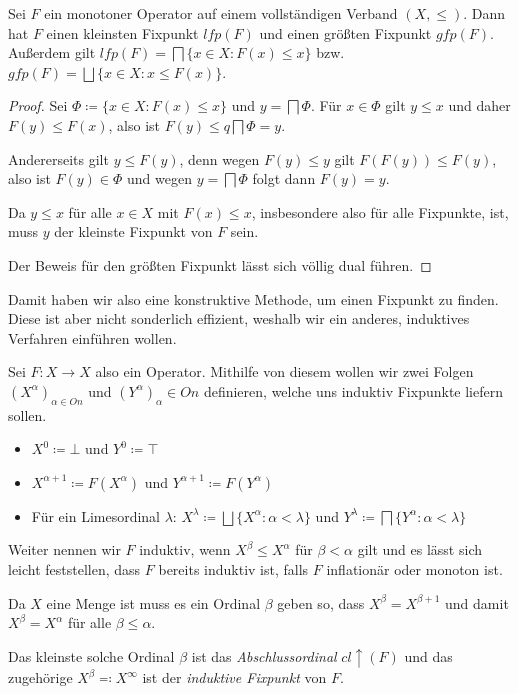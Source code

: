 \begin{satz}
	Sei $F$ ein monotoner Operator auf einem vollständigen Verband $(X,\leq)$. Dann hat $F$ einen kleinsten Fixpunkt $lfp(F)$ und einen größten Fixpunkt $gfp(F)$. Außerdem gilt $lfp(F)=\bigsqcap\{x\in X : F(x)\leq x\}$ bzw. $gfp(F)=\bigsqcup\{x\in X : x\leq F(x)\}$.
	\label{Knaster-Tarski}
\end{satz}
\begin{proof}
	Sei $\Phi\coloneqq \{x\in X : F(x)\leq x\}$ und $y=\bigsqcap\Phi$. Für $x\in\Phi$ gilt $y\leq x$ und daher $F(y)\leq F(x)$, also ist $F(y)\le q\bigsqcap \Phi = y$.
	
	Andererseits gilt $y\leq F(y)$, denn wegen $F(y)\leq y$ gilt $F(F(y))\leq F(y)$, also ist $F(y)\in \Phi$ und wegen $y=\bigsqcap\Phi$ folgt dann $F(y)=y$.
	
	Da $y\leq x$ für alle $x\in X$ mit $F(x)\leq x$, insbesondere also für alle Fixpunkte, ist, muss $y$ der kleinste Fixpunkt von $F$ sein.
	
	Der Beweis für den größten Fixpunkt lässt sich völlig dual führen.
\end{proof}

Damit haben wir also eine konstruktive Methode, um einen Fixpunkt zu finden. Diese ist aber nicht sonderlich effizient, weshalb wir ein anderes, induktives Verfahren einführen wollen.

Sei $F:X\to X$ also ein Operator. Mithilfe von diesem wollen wir zwei Folgen $(X^\alpha)_{\alpha\in On}$ und $(Y^\alpha)_\alpha\in On$ definieren, welche uns induktiv Fixpunkte liefern sollen.
\begin{itemize}
	\item $X^0\coloneqq\bot$ und $Y^0\coloneqq\top$
	\item $X^{\alpha+1}\coloneqq F(X^\alpha)$ und $Y^{\alpha+1}\coloneqq F(Y^\alpha)$
	\item Für ein Limesordinal $\lambda$: $X^\lambda \coloneqq \bigsqcup\{X^\alpha : \alpha<\lambda\}$ und 
	$Y^\lambda \coloneqq \bigsqcap\{Y^\alpha : \alpha < \lambda\}$
\end{itemize}

Weiter nennen wir $F$ induktiv, wenn $X^\beta \leq X^\alpha$ für $\beta<\alpha$ gilt und es lässt sich leicht feststellen, dass $F$ bereits induktiv ist, falls $F$ inflationär oder monoton ist.

\begin{definition}
	Da $X$ eine Menge ist muss es ein Ordinal $\beta$ geben so, dass $X^\beta= X^{\beta+1}$ und damit $X^\beta=X^\alpha$ für alle $\beta \leq \alpha$. 
	
	Das kleinste solche Ordinal $\beta$ ist das \textit{Abschlussordinal} $cl\uparrow(F)$ und das zugehörige $X^\beta \eqqcolon X^\infty$ ist der \textit{induktive Fixpunkt} von $F$.
\end{definition}

